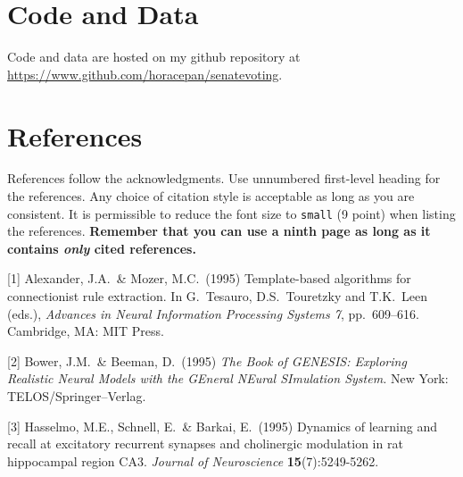 \documentclass{article}
\begin{document}
\section{Code and Data}
Code and data are hosted on my github repository at \href{https://www.github.com/horacepan/senatevoting}{https://www.github.com/horacepan/senatevoting}.

\section*{References}
References follow the acknowledgments. Use unnumbered first-level
heading for the references. Any choice of citation style is acceptable
as long as you are consistent. It is permissible to reduce the font
size to \verb+small+ (9 point) when listing the references. {\bf
  Remember that you can use a ninth page as long as it contains
  \emph{only} cited references.}
\medskip

\small

[1] Alexander, J.A.\ \& Mozer, M.C.\ (1995) Template-based algorithms
for connectionist rule extraction. In G.\ Tesauro, D.S.\ Touretzky and
T.K.\ Leen (eds.), {\it Advances in Neural Information Processing
  Systems 7}, pp.\ 609--616. Cambridge, MA: MIT Press.

[2] Bower, J.M.\ \& Beeman, D.\ (1995) {\it The Book of GENESIS:
  Exploring Realistic Neural Models with the GEneral NEural SImulation
  System.}  New York: TELOS/Springer--Verlag.

[3] Hasselmo, M.E., Schnell, E.\ \& Barkai, E.\ (1995) Dynamics of
learning and recall at excitatory recurrent synapses and cholinergic
modulation in rat hippocampal region CA3. {\it Journal of
  Neuroscience} {\bf 15}(7):5249-5262.
\end{document}

